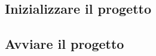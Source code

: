 \documentclass[12pt, letterpaper]{article}
\begin{document}
\subsection{Inizializzare il progetto}


\subsection{Avviare il progetto}







\end{document}

